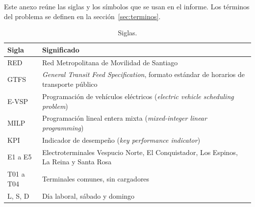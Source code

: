 Este anexo reúne las siglas y los símbolos que se usan en el informe. Los términos del problema se definen en la sección~\ref{sec:terminos}.

\begin{table}[H]
\centering
\caption{Siglas.}
\label{tab:siglas}
\small
\begin{tabularx}{\textwidth}{@{}l X@{}}
\toprule
Sigla & Significado \\
\midrule
RED & Red Metropolitana de Movilidad de Santiago \\
GTFS & \emph{General Transit Feed Specification}, formato estándar de horarios de transporte público \\
E-VSP & Programación de vehículos eléctricos (\emph{electric vehicle scheduling problem}) \\
MILP & Programación lineal entera mixta (\emph{mixed-integer linear programming}) \\
KPI & Indicador de desempeño (\emph{key performance indicator}) \\
E1 a E5 & Electroterminales Vespucio Norte, El Conquistador, Los Espinos, La Reina y Santa Rosa \\
T01 a T04 & Terminales comunes, sin cargadores \\
L, S, D & Día laboral, sábado y domingo \\
\bottomrule
\end{tabularx}
\end{table}


